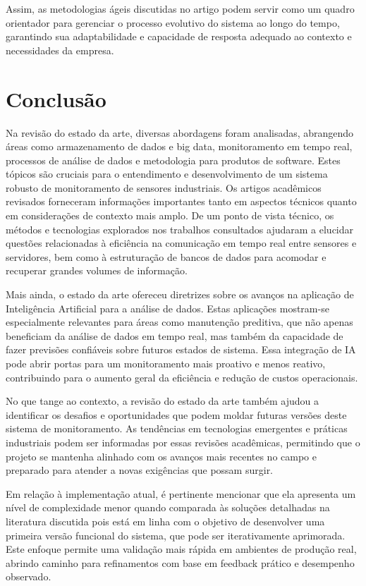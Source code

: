 Assim, as metodologias ágeis discutidas no artigo podem servir como um quadro orientador para gerenciar o processo evolutivo do sistema ao longo do tempo, garantindo sua adaptabilidade e capacidade de resposta adequado ao contexto e necessidades da empresa.


\section{Conclusão}
Na revisão do estado da arte, diversas abordagens foram analisadas, abrangendo áreas como armazenamento de dados e big data, monitoramento em tempo real, processos de análise de dados e metodologia para produtos de software. Estes tópicos são cruciais para o entendimento e desenvolvimento de um sistema robusto de monitoramento de sensores industriais. Os artigos acadêmicos revisados forneceram informações importantes tanto em aspectos técnicos quanto em considerações de contexto mais amplo. De um ponto de vista técnico, os métodos e tecnologias explorados nos trabalhos consultados ajudaram a elucidar questões relacionadas à eficiência na comunicação em tempo real entre sensores e servidores, bem como à estruturação de bancos de dados para acomodar e recuperar grandes volumes de informação.

Mais ainda, o estado da arte ofereceu diretrizes sobre os avanços na aplicação de Inteligência Artificial para a análise de dados. Estas aplicações mostram-se especialmente relevantes para áreas como manutenção preditiva, que não apenas beneficiam da análise de dados em tempo real, mas também da capacidade de fazer previsões confiáveis sobre futuros estados de sistema. Essa integração de IA pode abrir portas para um monitoramento mais proativo e menos reativo, contribuindo para o aumento geral da eficiência e redução de custos operacionais.

No que tange ao contexto, a revisão do estado da arte também ajudou a identificar os desafios e oportunidades que podem moldar futuras versões deste sistema de monitoramento. As tendências em tecnologias emergentes e práticas industriais podem ser informadas por essas revisões acadêmicas, permitindo que o projeto se mantenha alinhado com os avanços mais recentes no campo e preparado para atender a novas exigências que possam surgir.

Em relação à implementação atual, é pertinente mencionar que ela apresenta um nível de complexidade menor quando comparada às soluções detalhadas na literatura discutida pois está em linha com o objetivo de desenvolver uma primeira versão funcional do sistema, que pode ser iterativamente aprimorada. Este enfoque permite uma validação mais rápida em ambientes de produção real, abrindo caminho para refinamentos com base em feedback prático e desempenho observado.

